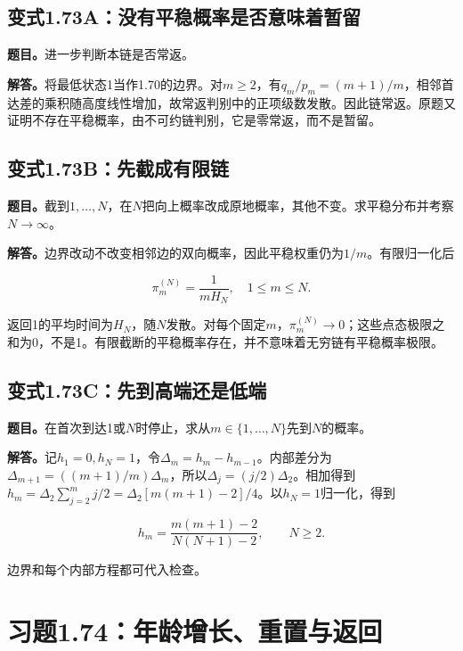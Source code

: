 \documentclass[
  11pt,a4paper,UTF8,fontset=fandol]{ctexart}
\begin{document}
\subsection{变式1.73A：没有平稳概率是否意味着暂留}\label{ux53d8ux5f0f1.73aux6ca1ux6709ux5e73ux7a33ux6982ux7387ux662fux5426ux610fux5473ux7740ux6682ux7559}

\textbf{题目。}进一步判断本链是否常返。

\textbf{解答。}将最低状态1当作1.70的边界。对\(m\ge2\)，有\(q_m/p_m=(m+1)/m\)，相邻首达差的乘积随高度线性增加，故常返判别中的正项级数发散。因此链常返。原题又证明不存在平稳概率，由不可约链判别，它是\(\boxed{\text{零常返}}\)，而不是暂留。

\subsection{变式1.73B：先截成有限链}\label{ux53d8ux5f0f1.73bux5148ux622aux6210ux6709ux9650ux94fe}

\textbf{题目。}截到\(1,\ldots,N\)，在\(N\)把向上概率改成原地概率，其他不变。求平稳分布并考察\(N\to\infty\)。

\textbf{解答。}边界改动不改变相邻边的双向概率，因此平稳权重仍为\(1/m\)。有限归一化后

\[\boxed{\pi_m^{(N)}=\frac1{mH_N},\quad1\le m\le N.}\]

返回1的平均时间为\(H_N\)，随\(N\)发散。对每个固定\(m\)，\(\pi_m^{(N)}\to0\)；这些点态极限之和为0，不是1。有限截断的平稳概率存在，并不意味着无穷链有平稳概率极限。

\subsection{变式1.73C：先到高端还是低端}\label{ux53d8ux5f0f1.73cux5148ux5230ux9ad8ux7aefux8fd8ux662fux4f4eux7aef}

\textbf{题目。}在首次到达1或\(N\)时停止，求从\(m\in\{1,\ldots,N\}\)先到\(N\)的概率。

\textbf{解答。}记\(h_1=0,h_N=1\)，令\(\Delta_m=h_m-h_{m-1}\)。内部差分为\(\Delta_{m+1}=((m+1)/m)\Delta_m\)，所以\(\Delta_j=(j/2)\Delta_2\)。相加得到\(h_m=\Delta_2\sum_{j=2}^m j/2=\Delta_2[m(m+1)-2]/4\)。以\(h_N=1\)归一化，得到

\[\boxed{h_m=\frac{m(m+1)-2}{N(N+1)-2},\qquad N\ge2.}\]

边界和每个内部方程都可代入检查。

\section{习题1.74：年龄增长、重置与返回}\label{ux4e60ux98981.74ux5e74ux9f84ux589eux957fux91cdux7f6eux4e0eux8fd4ux56de}
\end{document}
